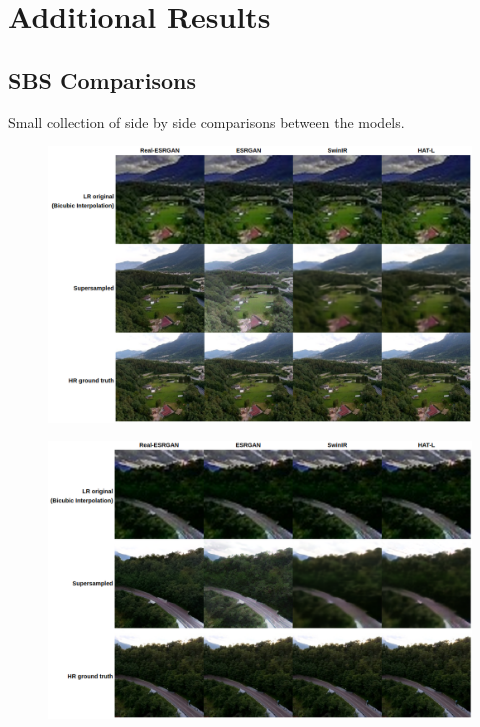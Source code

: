 \chapter{Additional Results}
\label{att:add_results}

\section{SBS Comparisons}

Small collection of side by side comparisons between the models.
\begin{figure}[H]
  \includegraphics[scale=0.45]{figures/allegati/sbs_1.png}
  \label{img:sbs1}
\end{figure}
\begin{figure}[H]
  \includegraphics[scale=0.45]{figures/allegati/sbs_2.png}
  \label{img:sbs2}
\end{figure}

